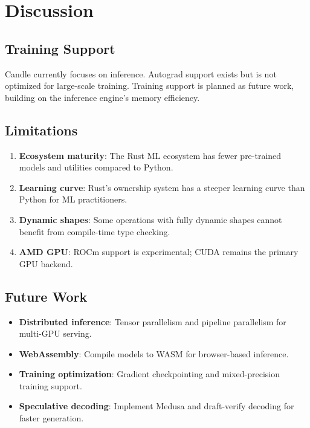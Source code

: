 \section{Discussion}

\label{sec:discussion}

\subsection{Training Support}

Candle currently focuses on inference. Autograd support exists but is not optimized for large-scale training. Training support is planned as future work, building on the inference engine's memory efficiency.

\subsection{Limitations}

\begin{enumerate}[leftmargin=1.4em]
    \item \textbf{Ecosystem maturity}: The Rust ML ecosystem has fewer pre-trained models and utilities compared to Python.
    \item \textbf{Learning curve}: Rust's ownership system has a steeper learning curve than Python for ML practitioners.
    \item \textbf{Dynamic shapes}: Some operations with fully dynamic shapes cannot benefit from compile-time type checking.
    \item \textbf{AMD GPU}: ROCm support is experimental; CUDA remains the primary GPU backend.
\end{enumerate}

\subsection{Future Work}

\begin{itemize}[leftmargin=1.1em]
    \item \textbf{Distributed inference}: Tensor parallelism and pipeline parallelism for multi-GPU serving.
    \item \textbf{WebAssembly}: Compile models to WASM for browser-based inference.
    \item \textbf{Training optimization}: Gradient checkpointing and mixed-precision training support.
    \item \textbf{Speculative decoding}: Implement Medusa and draft-verify decoding for faster generation.
\end{itemize}

